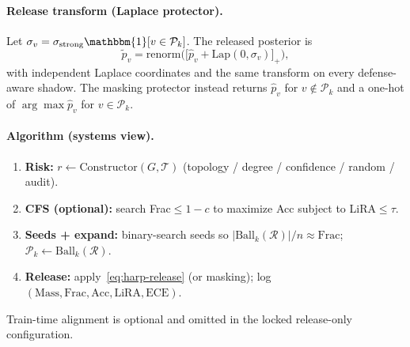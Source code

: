 \documentclass[conference]{IEEEtran}
\begin{document}
\paragraph{Release transform (Laplace protector).}
Let $\sigma_v=\sigma_{\mathrm{strong}}\mathbbm{1}[v\in\mathcal{P}_k]$.
The released posterior is
\begin{equation}
\tilde p_v=\mathrm{renorm}\big(\big[\hat p_v+\mathrm{Lap}(0,\sigma_v)\big]_+\big),
\label{eq:harp-release}
\end{equation}
with independent Laplace coordinates and the same transform on every defense-aware shadow.
The masking protector instead returns $\hat p_v$ for $v\notin\mathcal{P}_k$ and a one-hot of $\arg\max\hat p_v$ for $v\in\mathcal{P}_k$.

\paragraph{Algorithm (systems view).}
\begin{enumerate}
  \item \textbf{Risk:} $r\leftarrow\mathrm{Constructor}(G,\mathcal{T})$ (topology / degree / confidence / random / audit).
  \item \textbf{CFS (optional):} search Frac$\le 1-c$ to maximize Acc subject to LiRA$\le\tau$.
  \item \textbf{Seeds + expand:} binary-search seeds so $|\mathrm{Ball}_k(\mathcal{R})|/n\approx\mathrm{Frac}$; $\mathcal{P}_k\leftarrow\mathrm{Ball}_k(\mathcal{R})$.
  \item \textbf{Release:} apply~\eqref{eq:harp-release} (or masking); log $(\mathrm{Mass},\mathrm{Frac},\mathrm{Acc},\mathrm{LiRA},\mathrm{ECE})$.
\end{enumerate}
Train-time alignment is optional and omitted in the locked release-only configuration.
\end{document}
